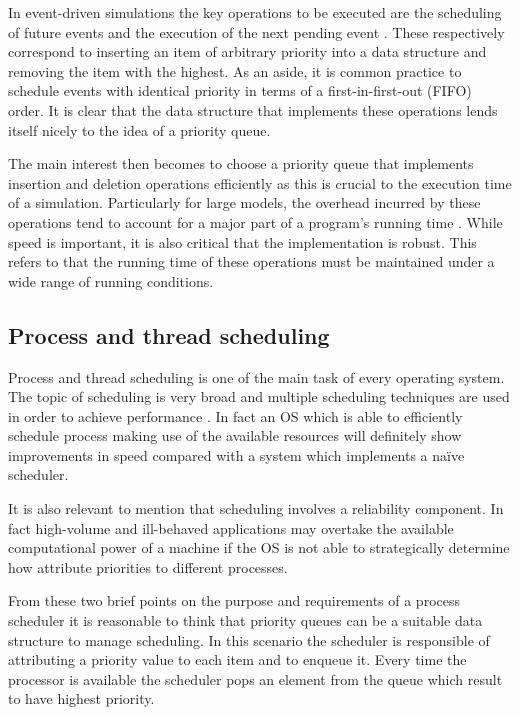 \documentclass{article}
\begin{document}
In event-driven simulations the key operations to be executed are the scheduling of future events and the execution of the next pending event \cite{vaucher, McCormack}. These respectively correspond to inserting an item of arbitrary priority into a data structure and removing the item with the highest. As an aside, it is common practice to schedule events with identical priority in terms of a first-in-first-out (FIFO) order. It is clear that the data structure that implements these operations lends itself nicely to the idea of a priority queue.

The main interest then becomes to choose a priority queue that implements insertion and deletion operations efficiently as this is crucial to the execution time of a simulation. Particularly for large models, the overhead incurred by these operations tend to account for a major part of a program's running time \cite{vaucher}. While speed is important, it is also critical that the implementation is robust. This refers to that the running time of these operations must be maintained under a wide range of running conditions.

\subsection{Process and thread scheduling}
Process and thread scheduling is one of the main task of every operating system. The topic of scheduling is very broad and multiple scheduling techniques are used in order to achieve performance \cite{coffman1968computer}. In fact an OS which is able to efficiently schedule process making use of the available resources will definitely show improvements in speed compared with a system which implements a naïve scheduler.

It is also relevant to mention that scheduling involves a reliability component. In fact high-volume and ill-behaved applications may overtake the available computational power of a machine if the OS is not able to strategically determine how attribute priorities to different processes.

From these two brief points on the purpose and requirements of a process scheduler it is reasonable to think that priority queues can be a suitable data structure to manage scheduling. In this scenario the scheduler is responsible of attributing a priority value to each item and to enqueue it. Every time the processor is available the scheduler pops an element from the queue which result to have highest priority.
\end{document}
